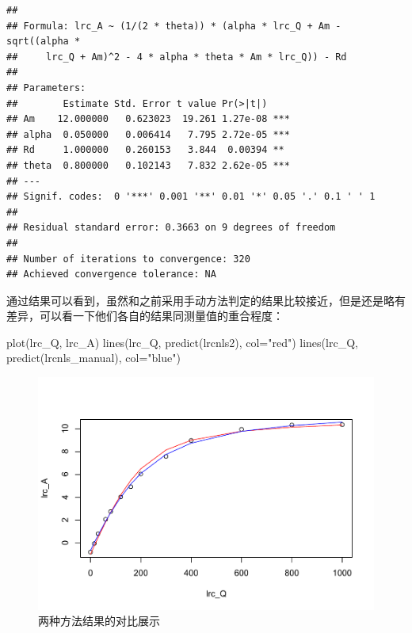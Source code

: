 \documentclass[
]{krantz}
\makeatletter
\newenvironment{Shaded}{\begin{snugshade}}{\end{snugshade}}
\newcommand{\AttributeTok}[1]{\textcolor[rgb]{0.77,0.63,0.00}{#1}}
\newcommand{\FunctionTok}[1]{\textcolor[rgb]{0.00,0.00,0.00}{#1}}
\newcommand{\NormalTok}[1]{#1}
\newcommand{\StringTok}[1]{\textcolor[rgb]{0.31,0.60,0.02}{#1}}
\newenvironment{kframe}{%
\medskip{}
\setlength{\fboxsep}{.8em}
 \def\at@end@of@kframe{}%
 \ifinner\ifhmode%
  \def\at@end@of@kframe{\end{minipage}}%
  \begin{minipage}{\columnwidth}%
 \fi\fi%
 \def\FrameCommand##1{\hskip\@totalleftmargin \hskip-\fboxsep
 \colorbox{shadecolor}{##1}\hskip-\fboxsep
     \hskip-\linewidth \hskip-\@totalleftmargin \hskip\columnwidth}%
 \MakeFramed {\advance\hsize-\width
   \@totalleftmargin\z@ \linewidth\hsize
   \@setminipage}}%
 {\par\unskip\endMakeFramed%
 \at@end@of@kframe}
\renewenvironment{Shaded}{\begin{kframe}}{\end{kframe}}
\makeatother
\begin{document}
\begin{verbatim}
## 
## Formula: lrc_A ~ (1/(2 * theta)) * (alpha * lrc_Q + Am - sqrt((alpha * 
##     lrc_Q + Am)^2 - 4 * alpha * theta * Am * lrc_Q)) - Rd
## 
## Parameters:
##        Estimate Std. Error t value Pr(>|t|)    
## Am    12.000000   0.623023  19.261 1.27e-08 ***
## alpha  0.050000   0.006414   7.795 2.72e-05 ***
## Rd     1.000000   0.260153   3.844  0.00394 ** 
## theta  0.800000   0.102143   7.832 2.62e-05 ***
## ---
## Signif. codes:  0 '***' 0.001 '**' 0.01 '*' 0.05 '.' 0.1 ' ' 1
## 
## Residual standard error: 0.3663 on 9 degrees of freedom
## 
## Number of iterations to convergence: 320 
## Achieved convergence tolerance: NA
\end{verbatim}

通过结果可以看到，虽然和之前采用手动方法判定的结果比较接近，但是还是略有差异，可以看一下他们各自的结果同测量值的重合程度：

\begin{Shaded}
\begin{Highlighting}[]
\FunctionTok{plot}\NormalTok{(lrc\_Q, lrc\_A)}
\FunctionTok{lines}\NormalTok{(lrc\_Q,  }\FunctionTok{predict}\NormalTok{(lrcnls2), }\AttributeTok{col=}\StringTok{"red"}\NormalTok{)}
\FunctionTok{lines}\NormalTok{(lrc\_Q,  }\FunctionTok{predict}\NormalTok{(lrcnls\_manual), }\AttributeTok{col=}\StringTok{"blue"}\NormalTok{)}
\end{Highlighting}
\end{Shaded}

\begin{figure}
\centering
\includegraphics{bookdown_files/figure-latex/mcomp-1.pdf}
\caption{\label{fig:mcomp}两种方法结果的对比展示}
\end{figure}
\end{document}
